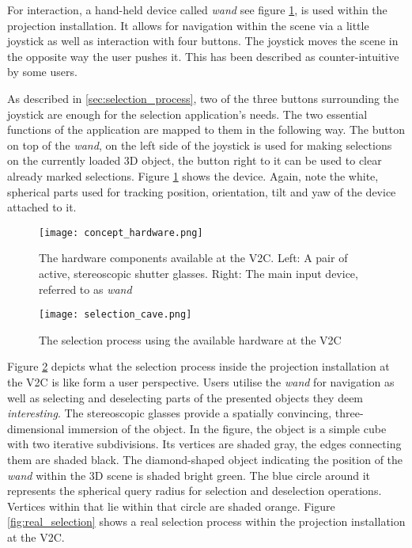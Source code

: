 For interaction, a hand-held device called \textit{wand} see figure \ref{fig:concept_hardware}, is used within the projection installation. It allows for navigation within the scene via a little joystick as well as interaction with four buttons. The joystick moves the scene in the opposite way the user pushes it. This has been described as counter-intuitive by some users.

As described in \ref{sec:selection_process}, two of the three buttons surrounding the joystick are enough for the selection application's needs. The two essential functions of the application are mapped to them in the following way. The button on top of the \textit{wand}, on the left side of the joystick is used for making selections on the currently loaded 3D object, the button  right to it can be used to clear already marked selections. Figure \ref{fig:concept_hardware} shows the device. Again, note the white, spherical parts used for tracking position, orientation, tilt and yaw of the device attached to it.

\begin{figure}[htb]
  \centering
  \texttt{[image: concept\_hardware.png]}\\ %
  \caption{The hardware components available at the V2C. Left: A pair of active, stereoscopic shutter glasses. Right: The main input device, referred to as \textit{wand}}
  \label{fig:concept_hardware}
\end{figure}

\begin{figure}[htb]
  \centering
  \texttt{[image: selection\_cave.png]}\\ %
  \caption{The selection process using the available hardware at the V2C}\label{fig:selection_cave}
\end{figure}

Figure \ref{fig:selection_cave} depicts what the selection process inside the projection installation at the V2C is like form a user perspective. Users utilise the \textit{wand} for navigation as well as selecting and deselecting parts of the presented objects they deem \textit{interesting}. The stereoscopic glasses provide a spatially convincing, three-dimensional immersion of the object. In the figure, the object is a simple cube with two iterative subdivisions. Its vertices are shaded gray, the edges connecting them are shaded black. The diamond-shaped object indicating the position of the \textit{wand} within the 3D scene is shaded bright green. The blue circle around it represents the spherical query radius for selection and deselection operations. Vertices within that lie within that circle are shaded orange. Figure \ref{fig:real_selection} shows a real selection process within the projection installation at the V2C.

